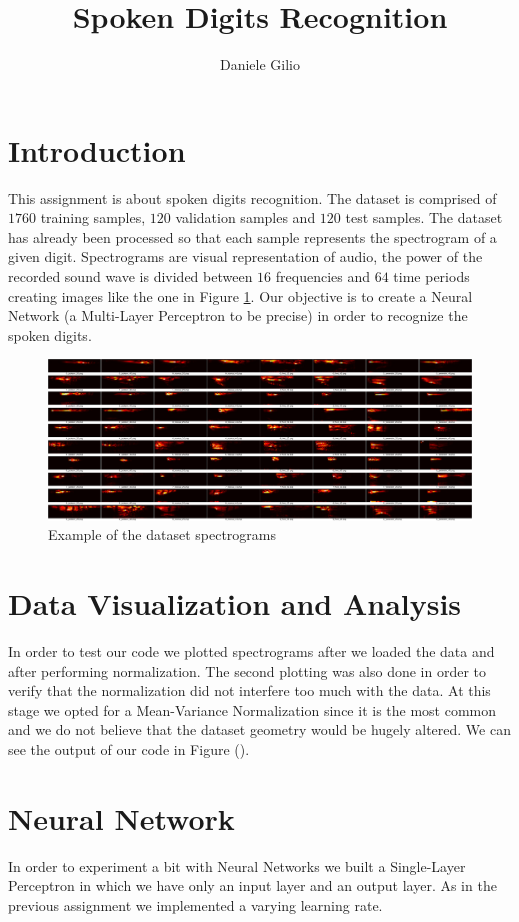 \documentclass[10pt,a4paper]{report}
\author{Daniele Gilio}
\title{Spoken Digits Recognition}
\begin{document}
\maketitle
\section{Introduction}
This assignment is about spoken digits recognition. The dataset is comprised of $1760$ training samples, $120$ validation samples and $120$ test samples. The dataset has already been processed so that each sample represents the spectrogram of a given digit. Spectrograms are visual representation of audio, the power of the recorded sound wave is divided between $16$ frequencies and $64$ time periods creating images like the one in Figure \ref{fig:data_spect}. Our objective is to create a Neural Network (a Multi-Layer Perceptron to be precise) in order to recognize the spoken digits.
\begin{figure}[!ht]
\centering
\includegraphics[width=\linewidth]{spoken-digits/spectrograms.png}
\caption{Example of the dataset spectrograms}
\label{fig:data_spect}
\end{figure}
\section{Data Visualization and Analysis}
In order to test our code we plotted spectrograms after we loaded the data and after performing normalization. The second plotting was also done in order to verify that the normalization did not interfere too much with the data. At this stage we opted for a Mean-Variance Normalization since it is the most common and we do not believe that the dataset geometry would be hugely altered. We can see the output of our code in Figure ().
\section{Neural Network}
In order to experiment a bit with Neural Networks we built a Single-Layer Perceptron in which we have only an input layer and an output layer. As in the previous assignment we implemented a varying learning rate.
\end{document}
